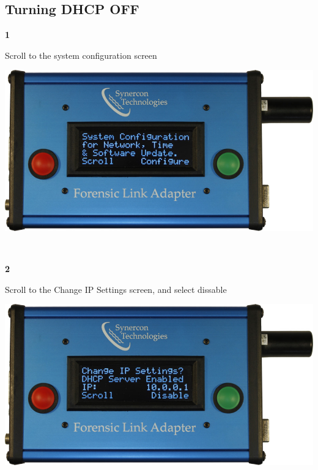 \documentclass[11pt, oneside]{book}
\begin{document}
\subsection{Turning DHCP OFF}
\noindent\begin{minipage}{0.45\textwidth}%
\begin{center}
\textbf{1}\\[\baselineskip]
\end{center}
Scroll to the system configuration screen
\end{minipage}%
\hfill%
\begin{minipage}{0.45\textwidth}
\includegraphics[width=\linewidth]{../media/fla_screens/ethernet_and_others/main/sys_conf}
\end{minipage}
\\[\baselineskip]
\noindent\begin{minipage}{0.45\textwidth}%
\begin{center}
\textbf{2}\\[\baselineskip]
\end{center}
Scroll to the Change IP Settings screen, and select dissable
\end{minipage}%
\hfill%
\begin{minipage}{0.45\textwidth}
\includegraphics[width=\linewidth]{../media/fla_screens/ethernet_and_others/sys_conf/dhcp_enabled}
\end{minipage}
\end{document}
